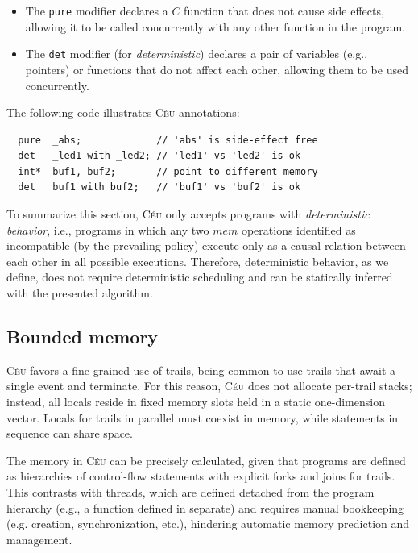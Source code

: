 \documentclass[preprint]{sigplanconf}
\newcommand{\CEU}{\textsc{C\'{e}u}\xspace}
\newcommand{\code}[1] {{\small{\texttt{#1}}}}
\newcommand{\1}{\;}
\newcommand{\2}{\;\;}
\newcommand{\3}{\;\;\;}
\newcommand{\5}{\;\;\;\;\;}
\begin{document}
\begin{itemize}
\item The \code{pure} modifier declares a $C$ function that does not cause side 
      effects, allowing it to be called concurrently with any other function in 
the program.
\item The \code{det} modifier (for \emph{deterministic}) declares a pair of 
      variables (e.g., pointers) or functions that do not affect each other, 
allowing them to be used concurrently.
\end{itemize}

The following code illustrates \CEU annotations:

{\small
\begin{verbatim}
  pure  _abs;             // 'abs' is side-effect free
  det   _led1 with _led2; // 'led1' vs 'led2' is ok
  int*  buf1, buf2;       // point to different memory
  det   buf1 with buf2;   // 'buf1' vs 'buf2' is ok
\end{verbatim}
}


To summarize this section, \CEU only accepts programs with \emph{deterministic 
behavior}, i.e., programs in which any two $mem$ operations identified as 
incompatible (by the prevailing policy) execute only as a causal relation 
between each other in all possible executions.
Therefore, deterministic behavior, as we define, does not require deterministic 
scheduling and can be statically inferred with the presented algorithm.

\subsection{Bounded memory}
\label{sec.safety.mem}

\CEU favors a fine-grained use of trails, being common to use trails that await 
a single event and terminate.
For this reason, \CEU does not allocate per-trail stacks; instead, all locals 
reside in fixed memory slots held in a static one-dimension vector.
Locals for trails in parallel must coexist in memory, while statements in 
sequence can share space.

The memory in \CEU can be precisely calculated, given that programs are defined 
as hierarchies of control-flow statements with explicit forks and joins for 
trails.
This contrasts with threads, which are defined detached from the program 
hierarchy (e.g., a function defined in separate) and requires manual 
bookkeeping (e.g. creation, synchronization, etc.), hindering automatic memory 
prediction and management.
\end{document}
